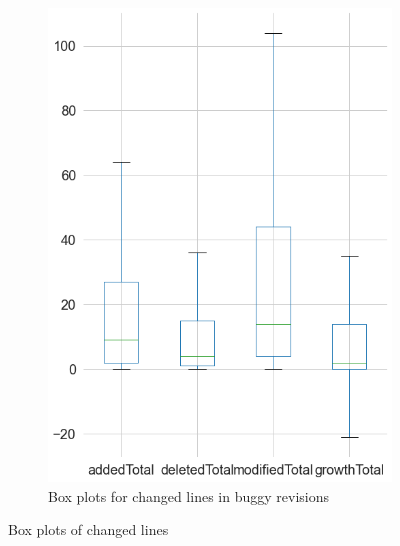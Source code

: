 \begin{figure}[H]
\begin{subfigure}{0.5\textwidth}
	\end{subfigure}%
	\begin{subfigure}{0.5\textwidth}
		\centering
		\includegraphics[scale=0.3]{./src/data_analysis/buggy_box_lines.png}
		\caption{Box plots for changed lines in buggy revisions}
	\end{subfigure}
	\caption{Box plots of changed lines}
	\label{box:changed_lines}
\end{figure}


